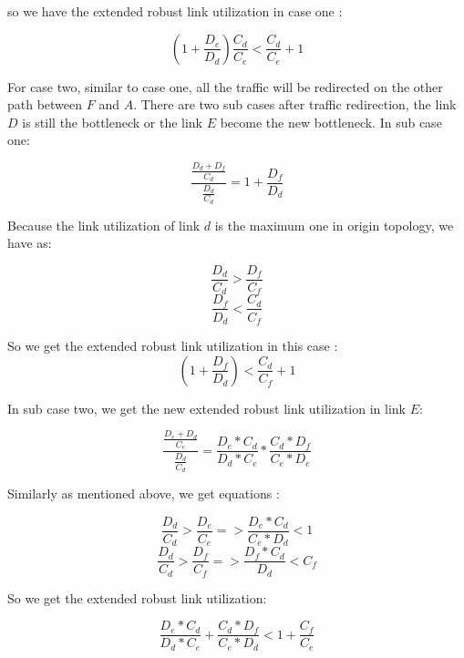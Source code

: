\documentclass[conference]{IEEEtran}
\begin{document}
so we have the extended robust link utilization in case one :

\begin{equation}
    (1 + \frac{D_e}{D_d}) \frac{C_d}{C_e} < \frac{C_d}{C_e} + 1
\end{equation}


For case two, similar to case one, all the traffic will be redirected on the other path between $F$ and $A$. There are two 
sub cases after traffic redirection, the link $D$ is still the bottleneck or the link $E$ become the new bottleneck. In sub 
case one:

\begin{equation}
    \frac{\frac{D_d + D_f}{C_d}}{\frac{D_d}{C_d}} = 1 + \frac{D_f}{D_d}
\end{equation}

Because the link utilization of link $d$ is the maximum one in origin topology, we have as:

\begin{equation}
    \frac{D_d}{C_d} > \frac{D_f}{C_f} 
\end{equation}
\begin{equation}
    \frac{D_f}{D_d} < \frac{C_d}{C_f} 
\end{equation}

So we get the extended robust link utilization in this case :
\begin{equation}
    (1 + \frac{D_f}{D_d}) < \frac{C_d}{C_f} + 1
\end{equation}

In sub case two, we get the new extended robust link utilization in link $E$:

\begin{equation}
    \frac{\frac{D_e + D_d}{C_e}}{\frac{D_d}{C_d}} = \frac{D_e * C_d}{D_d * C_e} * \frac{C_d * D_f}{C_e * D_e}
\end{equation}

Similarly as mentioned above, we get equations :

\begin{equation}
    \frac{D_d}{C_d} > \frac{D_e}{C_e} => \frac{D_e * C_d}{C_e * D_d} < 1 
\end{equation}
\begin{equation}
    \frac{D_d}{C_d} > \frac{D_f}{C_f} => \frac{D_f * C_d}{D_d} < C_f
\end{equation}

So we get the extended robust link utilization:

\begin{equation}
    \frac{D_e * C_d}{D_d * C_e} + \frac{C_d * D_f}{C_e * D_d} < 1 + \frac{C_f}{C_e}
\end{equation}
\end{document}
